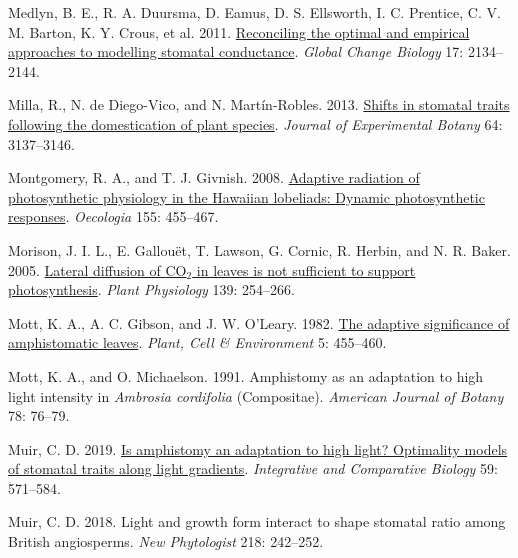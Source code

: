 \documentclass[
  letterpaper,
  DIV=11,
  numbers=noendperiod]{scrartcl}
\newlength{\cslhangindent}
\newlength{\cslentryspacingunit} %
\newenvironment{CSLReferences}[2] %
 {%
  \setlength{\parindent}{0pt}
  \ifodd #1
  \let\oldpar\par
  \def\par{\hangindent=\cslhangindent\oldpar}
  \fi
  \setlength{\parskip}{#2\cslentryspacingunit}
 }%
 {}
\begin{document}
\begin{CSLReferences}{1}{0}
\leavevmode{}%
Medlyn, B. E., R. A. Duursma, D. Eamus, D. S. Ellsworth, I. C. Prentice,
C. V. M. Barton, K. Y. Crous, et al. 2011.
\href{https://doi.org/10.1111/j.1365-2486.2010.02375.x}{Reconciling the
optimal and empirical approaches to modelling stomatal conductance}.
\emph{Global Change Biology} 17: 2134--2144.

\leavevmode{}%
Milla, R., N. de Diego-Vico, and N. Martín-Robles. 2013.
\href{https://doi.org/10.1093/jxb/ert147}{Shifts in stomatal traits
following the domestication of plant species}. \emph{Journal of
Experimental Botany} 64: 3137--3146.

\leavevmode{}%
Montgomery, R. A., and T. J. Givnish. 2008.
\href{https://doi.org/10.1007/s00442-007-0936-3}{Adaptive radiation of
photosynthetic physiology in the {Hawaiian} lobeliads: Dynamic
photosynthetic responses}. \emph{Oecologia} 155: 455--467.

\leavevmode{}%
Morison, J. I. L., E. Gallouët, T. Lawson, G. Cornic, R. Herbin, and N.
R. Baker. 2005. \href{https://doi.org/10.1104/pp.105.062950}{Lateral
diffusion of {CO}\(_{\textrm{2}}\) in leaves is not sufficient to
support photosynthesis}. \emph{Plant Physiology} 139: 254--266.

\leavevmode{}%
Mott, K. A., A. C. Gibson, and J. W. O'Leary. 1982.
\href{https://doi.org/10.1111/1365-3040.ep11611750}{The adaptive
significance of amphistomatic leaves}. \emph{Plant, Cell \& Environment}
5: 455--460.

\leavevmode{}%
Mott, K. A., and O. Michaelson. 1991. Amphistomy as an adaptation to
high light intensity in \emph{{Ambrosia} cordifolia} ({Compositae}).
\emph{American Journal of Botany} 78: 76--79.

\leavevmode{}%
Muir, C. D. 2019. \href{https://doi.org/10.1093/icb/icz085}{Is
amphistomy an adaptation to high light? {Optimality} models of stomatal
traits along light gradients}. \emph{Integrative and Comparative
Biology} 59: 571--584.

\leavevmode{}%
Muir, C. D. 2018. Light and growth form interact to shape stomatal ratio
among {British} angiosperms. \emph{New Phytologist} 218: 242--252.


\end{CSLReferences}
\end{document}
